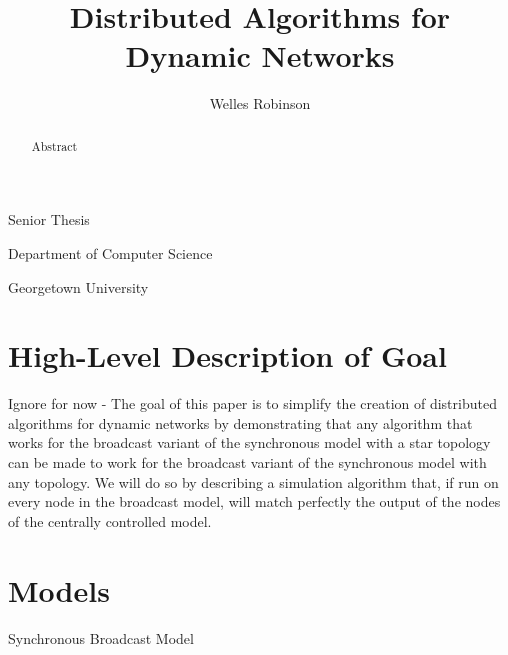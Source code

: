 \documentclass[english]{article}
\begin{document}
\title{Distributed Algorithms for Dynamic Networks}

\maketitle
\begin{center}\author{Welles Robinson}\end{center}
\noindent \begin{center}Senior Thesis\par\end{center}
\noindent \begin{center}Department of Computer
Science\par\end{center}
\noindent \begin{center}Georgetown University\par\end{center}

\newtheorem{definition} {Definition}
\newcommand{\mydef}[1]{\begin{definition}#1\end{definition}}

\begin{abstract}
Abstract
\end{abstract}

\section{High-Level Description of Goal}
Ignore for now - The goal of this paper is to simplify the creation of distributed algorithms for dynamic networks by demonstrating that any algorithm that works for the broadcast variant of the synchronous model with a star topology can be made to work for the broadcast variant of the synchronous model with any topology. 
We will do so by describing a simulation algorithm that, if run on every node in the broadcast model, will match perfectly the output of the nodes of the centrally controlled model.

\section{Models}

Synchronous Broadcast Model \\
\end{document}
